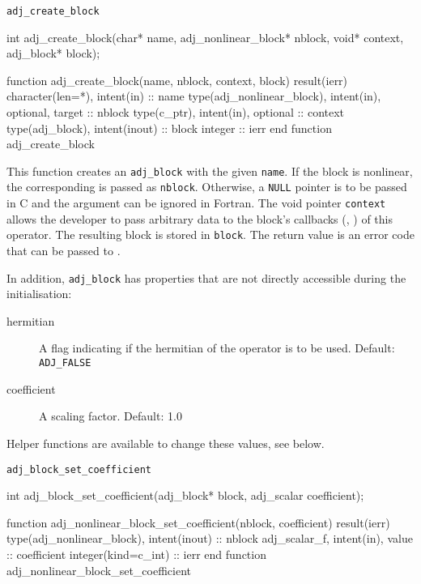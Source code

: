 \begin{boxwithtitle}{\texttt{adj_create_block}}
\begin{minipage}{\columnwidth}
\begin{ccode}
  int adj_create_block(char* name, adj_nonlinear_block* nblock, void* context, 
                       adj_block* block);
\end{ccode}
\begin{fortrancode}
  function adj_create_block(name, nblock, context, block) result(ierr)
    character(len=*), intent(in) :: name
    type(adj_nonlinear_block), intent(in), optional, target :: nblock
    type(c_ptr), intent(in), optional :: context
    type(adj_block), intent(inout) :: block
    integer :: ierr
  end function adj_create_block
\end{fortrancode}
\end{minipage}
\end{boxwithtitle}

This function creates an \texttt{adj_block} with the given \texttt{name}.
If the block is nonlinear, the corresponding  is passed as \texttt{nblock}. 
Otherwise, a \texttt{NULL} pointer is to be passed in C and the argument can be ignored in Fortran.
The void pointer \texttt{context} allows the developer to pass arbitrary data to the block's callbacks (, ) of this operator. 
The resulting block is stored in \texttt{block}. 
The return value is an error code that can be passed to .

In addition, \texttt{adj_block} has properties that are not directly accessible during the initialisation:

\begin{description}
  \item[hermitian] A flag indicating if the hermitian of the operator is to be used. Default: \texttt{ADJ_FALSE}
  \item[coefficient] A scaling factor. Default: 1.0
\end{description}

Helper functions are available to change these values, see below. 


\begin{boxwithtitle}{\texttt{adj_block_set_coefficient}}
\begin{minipage}{\columnwidth}
\begin{ccode}
  int adj_block_set_coefficient(adj_block* block, adj_scalar coefficient);
\end{ccode}
\begin{fortrancode}
  function adj_nonlinear_block_set_coefficient(nblock, coefficient) result(ierr)
    type(adj_nonlinear_block), intent(inout) :: nblock
    adj_scalar_f, intent(in), value :: coefficient
    integer(kind=c_int) :: ierr
  end function adj_nonlinear_block_set_coefficient
\end{fortrancode}
\end{minipage}
\end{boxwithtitle}

